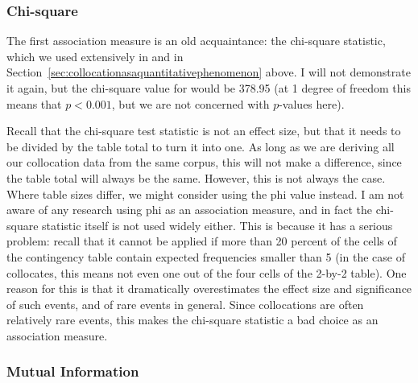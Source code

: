 \subsubsection{Chi-square}
\label{sec:amchisquare}

The first association  measure  is an old acquaintance: the chi-square  statistic, which we used extensively in  and in Section~\ref{sec:collocationasaquantitativephenomenon} above. I will not demonstrate it again, but the chi-square value for  would be 378.95 (at 1 degree of freedom this means that $p < 0.001$, but we are not concerned with $p$-values here).

Recall that the chi-square  test statistic is not an effect size,  but that it needs to be divided by the table total to turn it into one. As long as we are deriving all our collocation  data from the same corpus, this will not make a difference, since the table total will always be the same. However, this is not always the case. Where table sizes differ, we might consider using the phi value instead. I am not aware of any research using phi as an association  measure,  and in fact the chi-square  statistic itself is not used widely either. This is because it has a serious problem: recall that it cannot be applied if more than 20 percent of the cells of the contingency  table contain expected  frequencies smaller than 5 (in the case of collocates,  this means not even one out of the four cells of the 2-by-2 table). One reason for this is that it dramatically overestimates the effect size  and significance  of such events, and of rare events in general. Since collocations are often relatively rare events, this makes the chi-square  statistic a bad choice as an association measure. 

\subsubsection{Mutual Information}
\label{sec:ammutualinformation}

